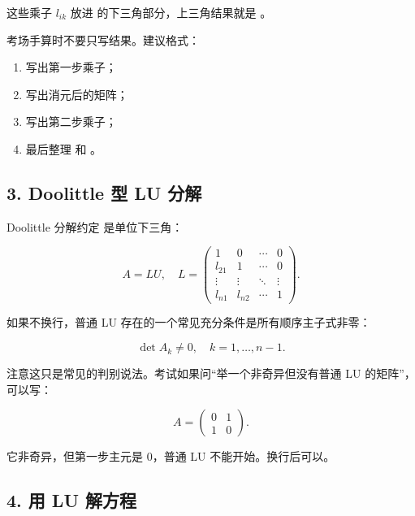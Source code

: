 \documentclass[11pt,a4paper]{ctexart}
\newcommand{\code}[1]{\begingroup\ttfamily\small #1\endgroup}
\begin{document}
这些乘子 $l_{ik}$ 放进 \code{} 的下三角部分，上三角结果就是 \code{}。

考场手算时不要只写结果。建议格式：

\begin{enumerate}

\item 写出第一步乘子；

\item 写出消元后的矩阵；

\item 写出第二步乘子；

\item 最后整理 \code{} 和 \code{}。

\end{enumerate}


\subsection*{3. Doolittle 型 LU 分解}


Doolittle 分解约定 \code{} 是单位下三角：

\[
A=LU,\quad
L=\begin{pmatrix}
1&0&\cdots&0\\
l_{21}&1&\cdots&0\\
\vdots&\vdots&\ddots&\vdots\\
l_{n1}&l_{n2}&\cdots&1
\end{pmatrix}.
\]

如果不换行，普通 LU 存在的一个常见充分条件是所有顺序主子式非零：

\[
\det A_k\ne 0,\quad k=1,\ldots,n-1.
\]

注意这只是常见的判别说法。考试如果问“举一个非奇异但没有普通 LU 的矩阵”，可以写：

\[
A=\begin{pmatrix}0&1\\1&0\end{pmatrix}.
\]

它非奇异，但第一步主元是 0，普通 LU 不能开始。换行后可以。


\subsection*{4. 用 LU 解方程}
\end{document}
